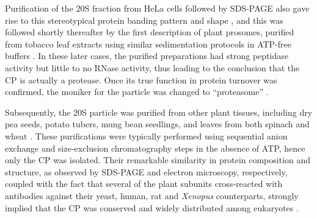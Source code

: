 Purification of the 20S fraction from HeLa cells followed by SDS-PAGE also gave rise to this stereotypical protein banding pattern and shape \citep{schmid84}, and this was followed shortly thereafter by the first description of plant prosomes, purified from tobacco leaf extracts using similar sedimentation protocols in ATP-free buffers \citep{kremp86}.  In these later cases, the purified preparations had strong peptidase activity but little to no RNase activity, thus leading to the conclusion that the CP is actually a protease.  Once its true function in protein turnover was confirmed, the moniker for the particle was changed to ``proteasome'' \citep{arrigo88}.  
	
	Subsequently, the 20S particle was purified from other plant tissues, including dry pea seeds, potato tubers, mung bean seedlings, and leaves from both spinach and wheat \citep{murray97, ozaki92, schliephacke91, skoda92}.  These purifications were typically performed using sequential anion exchange and size-exclusion chromatography steps in the absence of ATP, hence only the CP was isolated.  Their remarkable similarity in protein composition and structure, as observed by SDS-PAGE and electron microscopy, respectively, coupled with the fact that several of the plant subunits cross-reacted with antibodies against their yeast, human, rat and \textit{Xenopus} counterparts, strongly implied that the CP was conserved and widely distributed among eukaryotes \citep{schliephacke91}.
	

